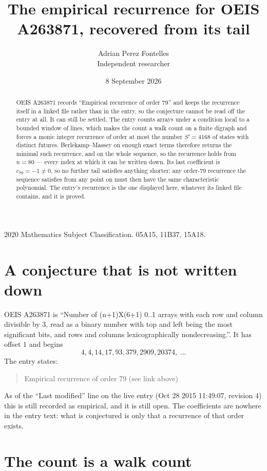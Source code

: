 \documentclass[11pt,a4paper]{article}
\title{The empirical recurrence for OEIS A263871, recovered from its tail}
\author{Adrian Perez Fontelles\\ \small Independent researcher}
\date{8 September 2026}
\theoremstyle{plain}
\theoremstyle{definition}
\begin{document}
\maketitle

\begin{abstract}
OEIS A263871 records ``Empirical recurrence of order $79$'' and keeps the recurrence itself in
a linked file rather than in the entry, so the conjecture cannot be read off the entry at all.
It can still be settled. The entry counts arrays under a condition local to a bounded window of
lines, which makes the count a walk count on a finite digraph and forces a monic integer
recurrence of order at most the number $S'=4168$ of states with distinct futures. Berlekamp--Massey on
enough exact terms therefore returns the minimal such recurrence, and on the whole sequence, so the recurrence holds from $n=80$ --- every index at which it can be written down.
Its last coefficient is $c_{79}=-1\neq0$, so no further tail satisfies anything
shorter; any order-$79$ recurrence the sequence satisfies from any point on must then have
the same characteristic polynomial. The entry's recurrence is the one displayed here, whatever
its linked file contains, and it is proved.
\end{abstract}

\noindent\small 2020 Mathematics Subject Classification. 05A15, 11B37, 15A18.\normalsize

\section{A conjecture that is not written down}

OEIS A263871 is ``Number of (n+1)X(6+1) 0..1 arrays with each row and column divisible by 3, read as a binary number with top and left being the most significant bits, and rows and columns lexicographically nondecreasing.''. It has offset $1$ and begins
\[
4, 4, 14, 17, 93, 379, 2909, 20374,\ \dots
\]
The entry states:
\begin{quote}
Empirical recurrence of order 79 (see link above)
\end{quote}
As of the ``Last modified'' line on the live entry (Oct 28 2015 11:49:07, revision 4)
this is still recorded as empirical, and it is still open. The coefficients are nowhere in the
entry text: what is conjectured is only that a recurrence of that order exists.

\section{The count is a walk count}
\end{document}
